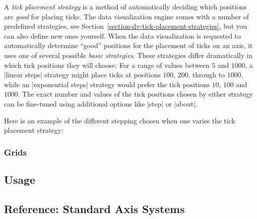 A \emph{tick placement strategy} is a method of automatically deciding
which positions are \emph{good} for placing ticks. The data
visualization engine comes with a number of predefined strategies, see
Section~\ref{section-dv-tick-placement-strategies}, but you can also
define new ones yourself. When the data visualization is requested to
automatically determine
``good'' positions for the placement of ticks on an axis, it uses one
of several possible \emph{basic strategies}. These strategies differ
dramatically in which tick positions they will choose: For a range of
values between $5$ and $1000$, a |linear steps| strategy might place
ticks at positions $100$, $200$, through to $1000$, while an
|exponential steps| strategy would prefer the tick positions $10$,
$100$ and $1000$. The exact number and values of the tick positions
chosen by either strategy can be fine-tuned using additional options
like |step| or |about|.

Here is an example of the different stepping chosen when one varies
the tick placement strategy:

\begin{codeexample}[]
\qquad
{}
\end{codeexample}



\subsubsection{Grids}

\subsection{Usage}


\subsection{Reference: Standard Axis Systems}

